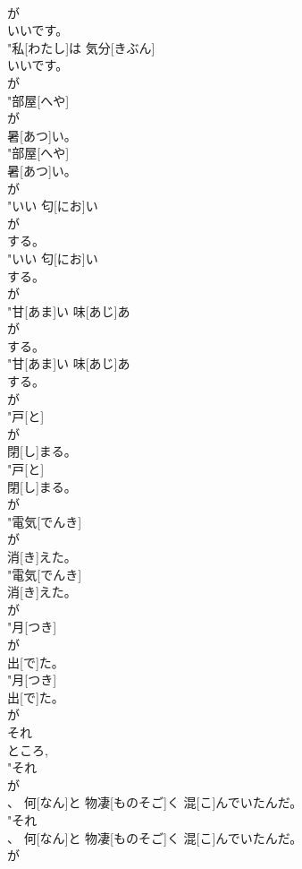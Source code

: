 \documentclass[8pt]{extreport}
\begin{document}
\begin{CJK}{UTF8}{min}
\\	が
\\	いいです。
\\	"私[わたし]は 気分[きぶん]
\\	いいです。
\\	が
\\	"部屋[へや]
\\	が
\\	暑[あつ]い。
\\	"部屋[へや]
\\	暑[あつ]い。
\\	が
\\	"いい 匂[にお]い
\\	が
\\	する。
\\	"いい 匂[にお]い
\\	する。
\\	が
\\	"甘[あま]い 味[あじ]あ
\\	が
\\	する。
\\	"甘[あま]い 味[あじ]あ
\\	する。
\\	が
\\	"戸[と]
\\	が
\\	閉[し]まる。
\\	"戸[と]
\\	閉[し]まる。
\\	が
\\	"電気[でんき]
\\	が
\\	消[き]えた。
\\	"電気[でんき]
\\	消[き]えた。
\\	が
\\	"月[つき]
\\	が
\\	出[で]た。
\\	"月[つき]
\\	出[で]た。
\\	が
\\	それ 
\\	ところ, 
\\	"それ
\\	が
\\	、 何[なん]と 物凄[ものそご]く 混[こ]んでいたんだ。
\\	"それ
\\	、 何[なん]と 物凄[ものそご]く 混[こ]んでいたんだ。
\\	が

\end{CJK}
\end{document}
